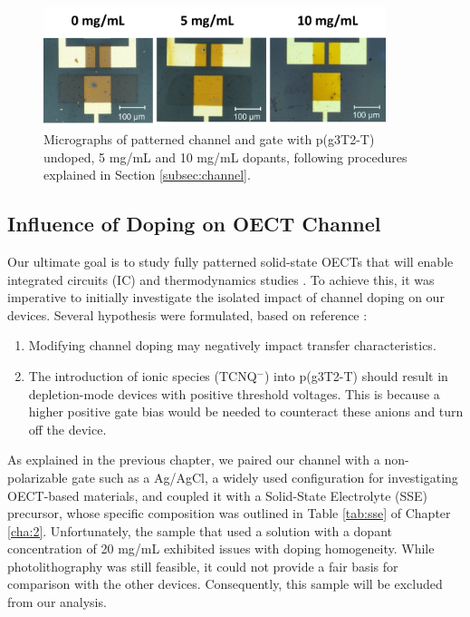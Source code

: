 \begin{figure}[ht]
  \centering
  \includegraphics[width=10cm]{Images/pdf/BigGateDevices.pdf}
  \caption[Micrographs of a patterned channel and gate p(g3T2-T) at different doping levels]{Micrographs of patterned channel and gate with p(g3T2-T) undoped, 5 mg/mL and 10 mg/mL dopants, following procedures explained in Section \ref{subsec:channel}.}
  \label{fig:channel}
\end{figure}


\subsection{Influence of Doping on OECT Channel}
Our ultimate goal is to study fully patterned solid-state OECTs that will enable integrated circuits (IC) and thermodynamics studies \cite{cucchiThermodynamicsOrganicElectrochemical2022}. To achieve this, it was imperative to initially investigate the isolated impact of channel doping on our devices. Several hypothesis were formulated, based on reference \cite{tanTuningOrganicElectrochemical2022}:

\begin{enumerate}
\item Modifying channel doping may negatively impact transfer characteristics.
\item The introduction of ionic species (TCNQ$^{-}$) into p(g3T2-T) should result in depletion-mode devices with positive threshold voltages. This is because a higher positive gate bias would be needed to counteract these anions and turn off the device.
\end{enumerate}

As explained in the previous chapter, we paired our channel with a non-polarizable gate such as a Ag/AgCl, a widely used configuration for investigating OECT-based materials, and coupled it with a Solid-State Electrolyte (SSE) precursor, whose specific composition was outlined in Table \ref{tab:sse} of Chapter \ref{cha:2}. Unfortunately, the sample that used a solution with a dopant concentration of 20 mg/mL exhibited issues with doping homogeneity. While photolithography was still feasible, it could not provide a fair basis for comparison with the other devices. Consequently, this sample will be excluded from our analysis.

